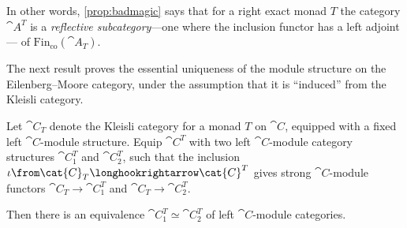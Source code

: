 \begin{remark}
  In other words, \cref{prop:badmagic} says that
  for a right exact monad \(T\) the category \(\cat{A}^T\) is
  a \emph{reflective subcategory}—one where the inclusion functor has a left adjoint—%
  of \(\mathrm{Fin}_{\mathrm{co}}(\cat{A}_T)\).
\end{remark}

The next result proves the essential uniqueness of the module structure
on the Eilenberg--Moore category,
under the assumption that it is ``induced'' from the Kleisli category.

\begin{theorem}\label{thm:one-module-structure-on-EM}
  Let \(\cat{C}_{T}\) denote the Kleisli category for a monad \(T\) on \(\cat{C}\),
  equipped with a fixed left \(\cat{C}\)\hyp{}module structure.
  Equip \(\cat{C}^T\) with two left \(\cat{C}\)\hyp{}module category structures
  \(\cat{C}^T_{1}\) and \(\cat{C}^T_{2}\),
  such that the inclusion
  \(\iota \from \cat{C}_T \longhookrightarrow \cat{C}^T\)
  gives strong \(\cat{C}\)\hyp{}module functors
  \(\cat{C}_{T} \to \cat{C}^T_{1}\)
  and \(\cat{C}_{T} \to \cat{C}^T_{2}\).

  Then there is an equivalence \(\cat{C}^T_{1} \simeq \cat{C}^T_{2}\) of left \(\cat{C}\)\hyp{}module categories.
\end{theorem}
